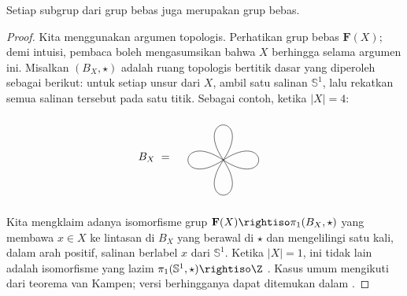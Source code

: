 \begin{theorem}
	Setiap subgrup dari grup bebas juga merupakan grup bebas.
\end{theorem}
\begin{proof}
	Kita menggunakan argumen topologis. Perhatikan grup bebas $\mathbf{F}(X)$; demi intuisi, pembaca boleh mengasumsikan bahwa $X$ berhingga selama argumen ini. Misalkan $(B_X, \star)$ adalah ruang topologis bertitik dasar yang diperoleh sebagai berikut: untuk setiap unsur dari $X$, ambil satu salinan $\mathbb{S}^1$, lalu rekatkan semua salinan tersebut pada satu titik. Sebagai contoh, ketika $|X|=4$:
	\[ B_X \; = \; \begin{tikzpicture}[baseline=(current bounding box.center)]
		\draw (0,0) .. controls (1, 1.5) and (-1, 1.5) .. (0,0);
		\draw[rotate=90] (0,0) .. controls (1, 1.5) and (-1, 1.5) .. (0,0);
		\draw[rotate=180] (0,0) .. controls (1, 1.5) and (-1, 1.5) .. (0,0);
		\draw[rotate=270] (0,0) .. controls (1, 1.5) and (-1, 1.5) .. (0,0);
	\end{tikzpicture}\]
	Kita mengklaim adanya isomorfisme grup $\mathbf{F}(X) \rightiso \pi_1(B_X, \star)$ yang membawa $x \in X$ ke lintasan di $B_X$ yang berawal di $\star$ dan mengelilingi satu kali, dalam arah positif, salinan berlabel $x$ dari $\mathbb{S}^1$. Ketika $|X|=1$, ini tidak lain adalah isomorfisme yang lazim $\pi_1(\mathbb{S}^1, \star) \rightiso \Z$ \cite[Bab IV \S 3.1]{You}. Kasus umum mengikuti dari teorema van Kampen; versi berhingganya dapat ditemukan dalam \cite[Lampiran B]{You}.


\end{proof}
